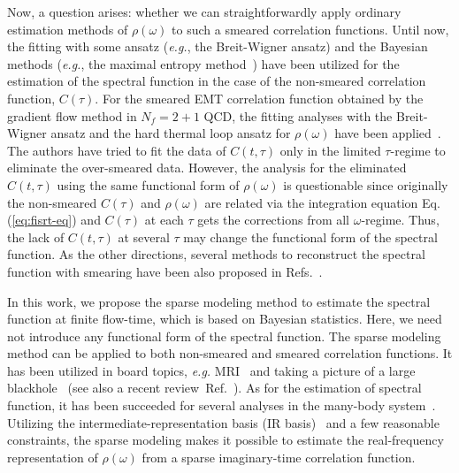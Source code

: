 \documentclass[a4paper,11pt]{article}
\begin{document}
Now, a question arises: whether we can straightforwardly apply ordinary estimation methods of $\rho(\omega)$ to such a smeared correlation functions. 
Until now, the fitting with some ansatz ({\it e.g.}, the Breit-Wigner ansatz) and the Bayesian methods ({\it e.g.}, the maximal entropy method~\cite{Nakahara:1999vy,Asakawa:2000tr}) have been utilized for the  estimation of the spectral function in the case of the non-smeared correlation function, $C(\tau)$.
 For the smeared EMT correlation function obtained by the gradient flow method in $N_f=2+1$ QCD, the fitting analyses with the Breit-Wigner ansatz and the hard thermal loop ansatz for $\rho(\omega)$ have been applied~\cite{Taniguchi:2019eid}.
The authors have tried to fit the data of $C(t,\tau)$ only in the limited $\tau$-regime to eliminate the over-smeared data. 
However, the analysis for the eliminated $C(t, \tau)$ using the same functional form of $\rho(\omega)$ is questionable since originally the non-smeared $C(\tau)$ and $\rho(\omega)$ are related via the integration equation Eq.(\ref{eq:fisrt-eq}) and $C(\tau)$ at each $\tau$ gets the corrections from all $\omega$-regime.
Thus, the lack of $C(t,\tau)$ at several $\tau$ may change the functional form of the spectral function.
As the other directions, several methods to reconstruct the spectral function with smearing have been also proposed in Refs.~\cite{Burnier:2013nla,Hansen:2017mnd,Tripolt:2018xeo,Hansen:2019idp,Kades:2019wtd, Bailas:2020qmv}.


In this work, we propose the sparse modeling method to estimate the spectral function at finite flow-time, which is based on Bayesian statistics.
Here, we need not introduce any functional form of the spectral function.
The sparse modeling method can be applied to both non-smeared and smeared correlation functions.
It has been utilized in board topics, {\it e.g.} MRI~\cite{MRI} and taking a picture of a large blackhole~\cite{Blackhole} (see also a recent review~Ref.~\cite{review-sparse}).
As for the estimation of spectral function, it has been succeeded for several analyses in the many-body system~\cite{Shinaoka2017a, Shinaoka2017b}.
Utilizing the intermediate-representation basis (IR basis)~\cite{Shinaoka2017a,Nagai2018,Chikano2018a,Chikano2018b,Li2019} and a few reasonable constraints, the sparse modeling makes it possible to estimate the real-frequency representation of $\rho(\omega)$ from a sparse imaginary-time correlation function.
\end{document}
